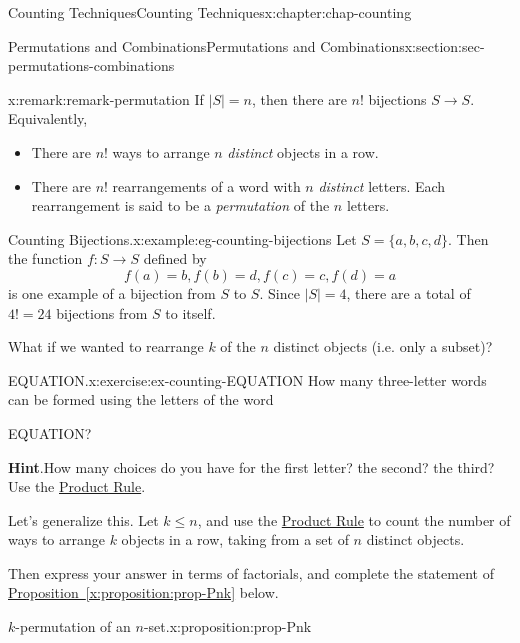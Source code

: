 \documentclass[oneside,10pt,]{book}
\newcommand{\blocktitlefont}{\relax}
\newcommand{\xreffont}{\relax}
\numberwithin{equation}{section}
\begin{document}
\begin{chapterptx}{Counting Techniques}{}{Counting Techniques}{}{}{x:chapter:chap-counting}
\begin{sectionptx}{Permutations and Combinations}{}{Permutations and Combinations}{}{}{x:section:sec-permutations-combinations}
\begin{remark}{}{x:remark:remark-permutation}%
If \(|S| = n\), then there are \(n!\) bijections \(S \rightarrow S\). Equivalently,%
\begin{itemize}[label=\textbullet]
\item{}There are \(n!\) ways to arrange \(n\) \emph{distinct} objects in a row.%
\item{}There are \(n!\) rearrangements of a word with \(n\) \emph{distinct} letters. Each rearrangement is said to be a \emph{permutation} of the \(n\) letters.%
\end{itemize}
%
\end{remark}
\begin{example}{Counting Bijections.}{x:example:eg-counting-bijections}%
Let \(S = \{a,b,c,d\}\). Then the function \(f: S \rightarrow S\) defined by%
\begin{equation*}
f(a) = b, f(b) = d, f(c) = c, f(d) = a
\end{equation*}
is one example of a bijection from \(S\) to \(S\). Since \(|S| = 4\), there are a total of \(4! = 24\) bijections from \(S\) to itself.%
\end{example}
What if we wanted to rearrange \(k\) of the \(n\) distinct objects (i.e. only a subset)?%
\begin{inlineexercise}{EQUATION.}{x:exercise:ex-counting-EQUATION}%
How many three-letter words can be formed using the letters of the word%
\begin{sidebyside}{1}{0.4}{0.4}{0}%
\begin{sbspanel}{0.2}%
EQUATION?%
\end{sbspanel}%
\end{sidebyside}%
\par\smallskip%
\noindent\textbf{\blocktitlefont Hint}.\hypertarget{g:hint:id471337}{}\quad{}How many choices do you have for the first letter? the second? the third? Use the \hyperref[x:principle:prin-prod-rule]{Product Rule}.%
\end{inlineexercise}
Let's generalize this. Let \(k \leq n\), and use the \hyperref[x:principle:prin-prod-rule]{Product Rule} to count the number of ways to arrange \(k\) objects in a row, taking from a set of \(n\) distinct objects.%
\par
Then express your answer in terms of factorials, and complete the statement of \hyperref[x:proposition:prop-Pnk]{Proposition~{\xreffont\ref{x:proposition:prop-Pnk}}} below.%
\begin{proposition}{\(k\)-permutation of an \(n\)-set.}{}{x:proposition:prop-Pnk}%

\end{proposition}
\end{sectionptx}
\end{chapterptx}
\end{document}
